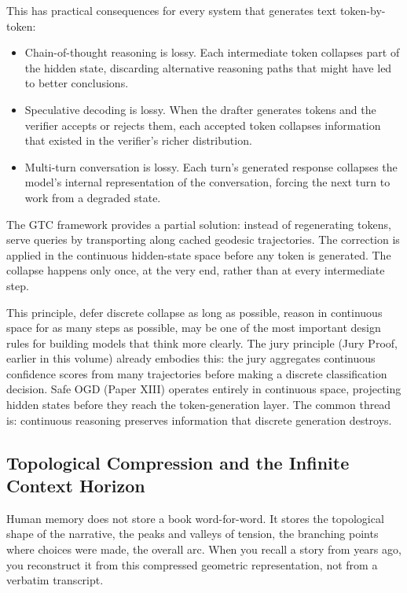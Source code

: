 \documentclass[11pt]{article}
\begin{document}
This has practical consequences for every system that generates text
token-by-token:

\begin{itemize}[nosep]
\item Chain-of-thought reasoning is lossy. Each intermediate token
      collapses part of the hidden state, discarding alternative reasoning
      paths that might have led to better conclusions.
\item Speculative decoding is lossy. When the drafter generates
      tokens and the verifier accepts or rejects them, each accepted token
      collapses information that existed in the verifier's richer
      distribution.
\item Multi-turn conversation is lossy. Each turn's generated
      response collapses the model's internal representation of the
      conversation, forcing the next turn to work from a degraded state.
\end{itemize}

The GTC framework provides a partial solution: instead of regenerating
tokens, serve queries by transporting along cached geodesic trajectories.
The correction is applied in the continuous hidden-state space before
any token is generated. The collapse happens only once, at the very end,
rather than at every intermediate step.

This principle, defer discrete collapse as long as possible, reason in
continuous space for as many steps as possible, may be one of the most
important design rules for building models that think more clearly. The jury
principle (Jury Proof, earlier in this volume) already embodies this: the
jury aggregates continuous confidence scores from many trajectories before
making a discrete classification decision. Safe OGD (Paper XIII) operates
entirely in continuous space, projecting hidden states before they reach the
token-generation layer. The common thread is: continuous reasoning
preserves information that discrete generation destroys.

\subsection{Topological Compression and the Infinite Context Horizon}

Human memory does not store a book word-for-word. It stores the topological
shape of the narrative, the peaks and valleys of tension, the branching
points where choices were made, the overall arc. When you recall a story
from years ago, you reconstruct it from this compressed geometric
representation, not from a verbatim transcript.
\end{document}
